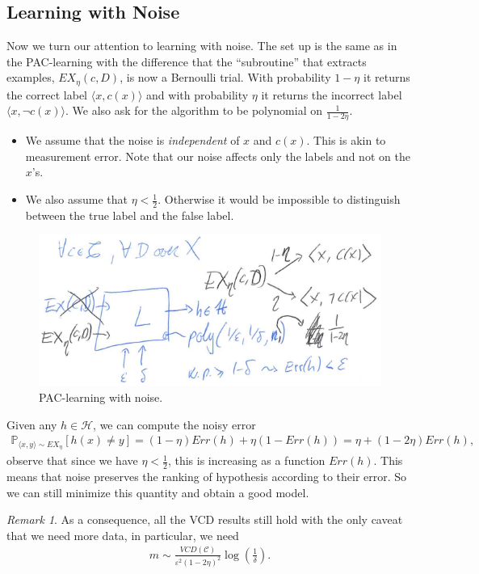 \documentclass[12pt, letterpaper]{article}
\numberwithin{equation}{section} %
\newcommand{\mb}{\mathbb}
\newcommand{\mc}{\mathcal}
\newcommand{\ve}{\varepsilon}
\theoremstyle{definition}
\theoremstyle{remark}
\newtheorem{remark}[theorem]{Remark}
\begin{document}
\subsection{Learning with Noise}
Now we turn our attention to learning with noise. The set up is the same as in the PAC-learning with the difference that the ``subroutine'' that extracts examples, $EX_\eta(c,D)$, is now a Bernoulli trial. With probability $1-\eta$ it returns the correct label $\langle x, c(x) \rangle$ and with probability $\eta$ it returns the incorrect label $\langle x, \lnot c(x) \rangle$. We also ask for the algorithm to be polynomial on $\frac1{1-2\eta}$.
\begin{itemize}
\item We assume that the noise is \emph{independent} of $x$ and $c(x)$. This is akin to measurement error. Note that our noise affects only the labels and not on the $x$'s.
\item We also assume that $\eta < \frac12$. Otherwise it would be impossible to distinguish between the true label and the false label.
\end{itemize}
\begin{figure}[H]
\centering
\includegraphics[width=0.6\linewidth]{../img/noise-pac.png}
\caption{PAC-learning with noise.}
\end{figure}

Given any $h\in \mc H$, we can compute the noisy error
\begin{align}
\mb P_{\langle x, y\rangle \sim EX_\eta}[h(x)\ne y] = (1-\eta)Err(h) + \eta(1-Err(h)) = \eta + (1-2\eta)Err(h),
\end{align}
observe that since we have $\eta < \frac12$, this is increasing as a function $Err(h)$. This means that noise preserves the ranking of hypothesis according to their error. So we can still minimize this quantity and obtain a good model.
\begin{remark}
As a consequence, all the VCD results still hold with the only caveat that we need more data, in particular, we need
\begin{align}
m \sim \frac{VCD(\mc C)}{\ve^2(1-2\eta)^2}\log\left(\frac1\delta\right).
\end{align}
\end{remark}
\end{document}
